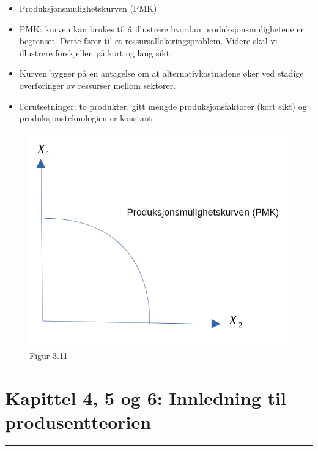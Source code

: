 \documentclass[
  letterpaper,
  DIV=11,
  numbers=noendperiod]{scrartcl}
\providecommand{\tightlist}{%
  \setlength{\itemsep}{0pt}\setlength{\parskip}{0pt}}\usepackage{longtable,booktabs,array}
\begin{document}
\begin{itemize}
\tightlist
\item
  Produksjonsmulighetskurven (PMK)
\item
  PMK: kurven kan brukes til å illustrere hvordan produksjonsmulighetene
  er begrenset. Dette fører til et ressursallokeringsproblem. Videre
  skal vi illustrere forskjellen på kort og lang sikt.
\item
  Kurven bygger på en antagelse om at alternativkostnadene øker ved
  stadige overføringer av ressurser mellom sektorer.
\item
  Forutsetninger: to produkter, gitt mengde produksjonsfaktorer (kort
  sikt) og produksjonsteknologien er konstant.
\end{itemize}

\begin{figure}[H]

{\centering \includegraphics[width=1\textwidth,height=\textheight]{drawio/pmk.png}

}

\caption{Figur 3.11}

\end{figure}%

\section{Kapittel 4, 5 og 6: Innledning til
produsentteorien}\label{kapittel-4-5-og-6-innledning-til-produsentteorien}

\begin{center}\rule{0.5\linewidth}{0.5pt}\end{center}
\end{document}

